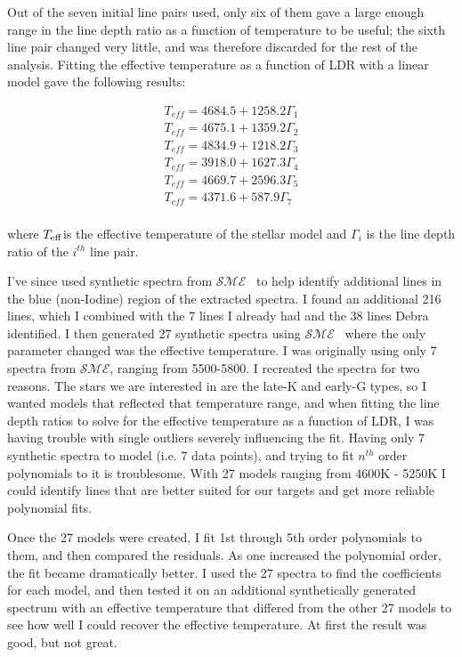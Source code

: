 \documentclass[iop]{emulateapj}
\def\teff{\mbox{$T_{\rm eff}$}}
\def\sme{$\mathcal{SME}$}
\begin{document}
Out of the seven initial line pairs used, only six of them gave a large enough range in the line depth ratio as a function of temperature to be useful; the sixth line pair changed very little, and was therefore discarded for the rest of the analysis. Fitting the effective temperature as a function of LDR with a linear model gave the following results:

\begin{eqnarray*}
T_{eff} = 4684.5 + 1258.2\Gamma_{1} \\
T_{eff} = 4675.1 + 1359.2\Gamma_{2} \\
T_{eff} = 4834.9 + 1218.2\Gamma_{3} \\
T_{eff} = 3918.0 + 1627.3\Gamma_{4} \\
T_{eff} = 4669.7 + 2596.3\Gamma_{5} \\
T_{eff} = 4371.6 + 587.9\Gamma_{7} \\
\end{eqnarray*}


where \teff is the effective temperature of the stellar model and $\Gamma_{i}$ is the line depth ratio of the $i^{th}$ line pair.

I've since used synthetic spectra from \sme~ to help identify additional lines in the blue (non-Iodine) region of the extracted spectra. I found an additional 216 lines, which I combined with the 7 lines I already had and the 38 lines Debra identified. I then generated 27 synthetic spectra using \sme~ where the only parameter changed was the effective temperature. I was originally using only 7 spectra from \sme, ranging from 5500-5800. I recreated the spectra for two reasons. The stars we are interested in are the late-K and early-G types, so I wanted models that reflected that temperature range, and when fitting the line depth ratios to solve for the effective temperature as a function of LDR, I was having trouble with single outliers severely influencing the fit. Having only 7 synthetic spectra to model (i.e. 7 data points), and trying to fit $n^{th}$ order polynomials to it is troublesome. With 27 models ranging from 4600K - 5250K I could identify lines that are better suited for our targets and get more reliable polynomial fits.

Once the 27 models were created, I fit 1st through 5th order polynomials to them, and then compared the residuals. As one increased the polynomial order, the fit became dramatically better. I used the 27 spectra to find the coefficients for each model, and then tested it on an additional synthetically generated spectrum with an effective temperature that differed from the other 27 models to see how well I could recover the effective temperature. At first the result was good, but not great.
\end{document}
